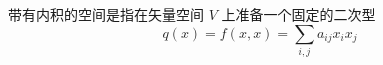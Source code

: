 
带有内积的空间是指在矢量空间 $V$ 上准备一个固定的二次型
\begin{equation}
q(x)=f(x,x)=\sum_{i,j}a_{ij}x_ix_j
\end{equation}
 